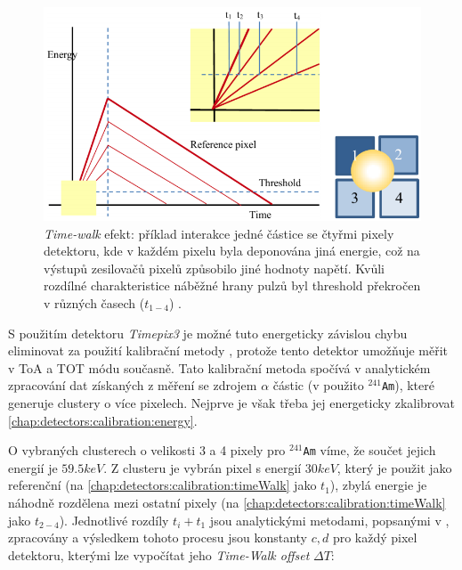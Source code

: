 \begin{figure}
	\begin{center}
		\includegraphics[width=12cm]{figures/calib_timeWalk.png}
		\caption{\textit{Time-walk} efekt: příklad interakce jedné částice se čtyřmi pixely detektoru, kde v každém pixelu byla deponována jiná energie, což na výstupů zesilovačů pixelů způsobilo jiné hodnoty napětí. Kvůli rozdílné charakteristice náběžné hrany pulzů byl threshold překročen v různých časech ($t_{1-4}$) \cite{Turecek2016TimeWakl}.}
		\label{fig:det:calib:timeWalk}
	\end{center}
\end{figure}

S použitím detektoru \textit{Timepix3} je možné tuto energeticky závislou chybu eliminovat za použití kalibrační metody \cite{Turecek2016TimeWakl}, protože tento detektor umožňuje měřit v ToA a TOT módu současně. Tato kalibrační metoda spočívá v analytickém zpracování dat získaných z měření se zdrojem $\alpha$ částic (v \cite{Turecek2016TimeWakl} použito $^{241}$\texttt{Am}), které generuje clustery o více pixelech. Nejprve je však třeba jej energeticky zkalibrovat \ref{chap:detectors:calibration:energy}. 

O vybraných clusterech o velikosti 3 a 4 pixely pro $^{241}$\texttt{Am} víme, že součet jejich energií je $59.5keV$. Z clusteru je vybrán pixel s energií $30keV$, který je použit jako referenční (na \ref{chap:detectors:calibration:timeWalk} jako $t_1$), zbylá energie je náhodně rozdělena mezi ostatní pixely (na \ref{chap:detectors:calibration:timeWalk} jako $t_{2-4}$). Jednotlivé rozdíly $t_i+t_1$ jsou analytickými metodami, popsanými v \cite{Turecek2016TimeWakl}, zpracovány a výsledkem tohoto procesu jsou konstanty $c,d$ pro každý pixel detektoru, kterými lze vypočítat jeho \textit{Time-Walk offset} $\Delta T$:

